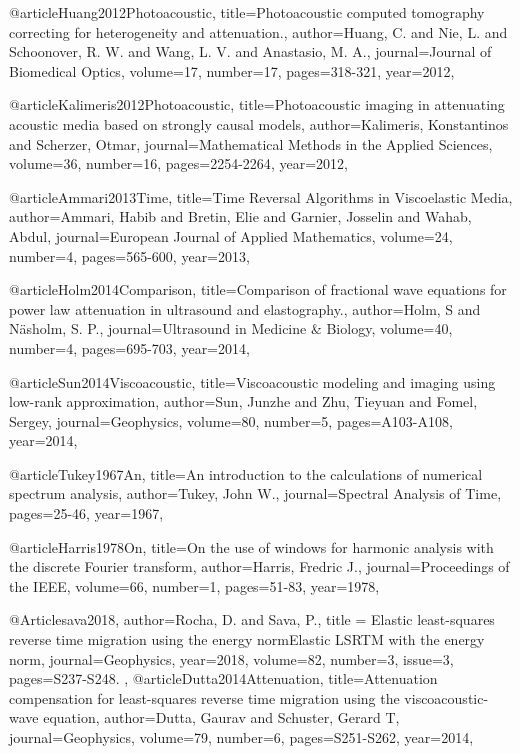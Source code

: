 @article{Huang2012Photoacoustic,
  title={Photoacoustic computed tomography correcting for heterogeneity and attenuation.},
  author={Huang, C. and Nie, L. and Schoonover, R. W. and Wang, L. V. and Anastasio, M. A.},
  journal={Journal of Biomedical Optics},
  volume={17},
  number={17},
  pages={318-321},
  year={2012},
}

@article{Kalimeris2012Photoacoustic,
  title={Photoacoustic imaging in attenuating acoustic media based on strongly causal models},
  author={Kalimeris, Konstantinos and Scherzer, Otmar},
  journal={Mathematical Methods in the Applied Sciences},
  volume={36},
  number={16},
  pages={2254-2264},
  year={2012},
}

@article{Ammari2013Time,
  title={Time Reversal Algorithms in Viscoelastic Media},
  author={Ammari, Habib and Bretin, Elie and Garnier, Josselin and Wahab, Abdul},
  journal={European Journal of Applied Mathematics},
  volume={24},
  number={4},
  pages={565-600},
  year={2013},
}

@article{Holm2014Comparison,
  title={Comparison of fractional wave equations for power law attenuation in ultrasound and elastography.},
  author={Holm, S and Näsholm, S. P.},
  journal={Ultrasound in Medicine \& Biology},
  volume={40},
  number={4},
  pages={695-703},
  year={2014},
}

@article{Sun2014Viscoacoustic,
  title={Viscoacoustic modeling and imaging using low-rank approximation},
  author={Sun, Junzhe and Zhu, Tieyuan and Fomel, Sergey},
  journal={Geophysics},
  volume={80},
  number={5},
  pages={A103-A108},
  year={2014},
}

@article{Tukey1967An,
  title={An introduction to the calculations of numerical spectrum analysis},
  author={Tukey, John W.},
  journal={Spectral Analysis of Time},
  pages={25-46},
  year={1967},
}

@article{Harris1978On,
  title={On the use of windows for harmonic analysis with the discrete {F}ourier transform},
  author={Harris, Fredric J.},
  journal={Proceedings of the IEEE},
  volume={66},
  number={1},
  pages={51-83},
  year={1978},
}

@Article{sava2018,
  author={Rocha, D. and Sava, P.},
  title = {Elastic least-squares reverse time migration using the energy normElastic LSRTM with the energy norm},
  journal={Geophysics},
  year=2018,
  volume=82,
  number=3,
  issue=3,
  pages={S237-S248. },
}
@article{Dutta2014Attenuation,
  title={Attenuation compensation for least-squares reverse time migration using the viscoacoustic-wave equation},
  author={Dutta, Gaurav and Schuster, Gerard T},
  journal={Geophysics},
  volume={79},
  number={6},
  pages={S251-S262},
  year={2014},
}

